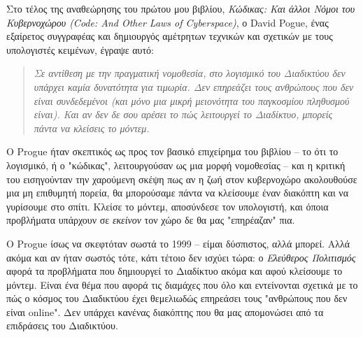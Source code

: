 Στο τέλος της αναθεώρησης του πρώτου μου βιβλίου, {\it Κώδικας: Και άλλοι Νόμοι του Κυβερνοχώρου (Code: And Other Laws of Cyberspace)}, ο David Pogue, ένας εξαίρετος συγγραφέας και δημιουργός αμέτρητων τεχνικών και σχετικών με τους υπολογιστές κειμένων, έγραψε αυτό:

\begin{quotation}
{\it Σε αντίθεση με την πραγματική νομοθεσία, στο λογισμικό του Διαδικτύου δεν υπάρχει καμία δυνατότητα για τιμωρία. Δεν επηρεάζει τους ανθρώπους που δεν είναι συνδεδεμένοι (και μόνο μια μικρή μειονότητα του παγκοσμίου πληθυσμού είναι). Και αν δεν δε σου αρέσει το πώς λειτουργεί το Διαδίκτυο, μπορείς πάντα να κλείσεις το μόντεμ.} 
\end{quotation}

Ο Progue ήταν σκεπτικός ως προς τον βασικό επιχείρημα του βιβλίου -- το ότι το λογισμικό, ή ο "κώδικας", λειτουργούσαν ως μια μορφή νομοθεσίας -- και η κριτική του εισηγούνταν την χαρούμενη σκέψη πως αν η ζωή στον κυβερνοχώρο ακολουθούσε μια μη επιθυμητή πορεία, θα μπορούσαμε πάντα να κλείσουμε έναν διακόπτη και να γυρίσουμε στο σπίτι. Κλείσε το μόντεμ, αποσύνδεσε τον υπολογιστή, και όποια προβλήματα υπάρχουν σε {\it εκείνον} τον χώρο δε θα μας "επηρέαζαν" πια.

 Ο Progue ίσως να σκεφτόταν σωστά το 1999 -- είμαι δύσπιστος, αλλά μπορεί. Αλλά ακόμα και αν ήταν σωστός τότε, κάτι τέτοιο δεν ισχύει τώρα: ο {\it Ελεύθερος Πολιτισμός} αφορά τα προβλήματα που δημιουργεί το Διαδίκτυο ακόμα και αφού κλείσουμε το μόντεμ. Είναι ένα θέμα που αφορά τις διαμάχες που όλο και εντείνονται σχετικά με το πώς ο κόσμος του Διαδικτύου έχει θεμελιωδώς επηρεάσει τους "ανθρώπους που δεν είναι online". Δεν υπάρχει κανένας διακόπτης που θα μας απομονώσει από τα επιδράσεις του Διαδικτύου.
